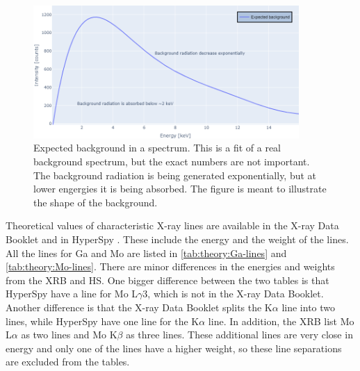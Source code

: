 \begin{figure}[p]
    \centering
    \includegraphics[width=0.9\textwidth]{figures/expected_background.png}
    \caption{
        Expected background in a spectrum.
        This is a fit of a real background spectrum, but the exact numbers are not important.
        The background radiation is being generated exponentially, but at lower engergies it is being absorbed.
        The figure is meant to illustrate the shape of the background.
    }
    \label{fig:theory:expected_background}
\end{figure}





Theoretical values of characteristic X-ray lines are available in the X-ray Data Booklet \cite{thompson_x-ray_2004} and in HyperSpy \cite{hyperspy_1.7.1}.
These include the energy and the weight of the lines.
All the lines for Ga and Mo are listed in \cref{tab:theory:Ga-lines} and \cref{tab:theory:Mo-lines}.
There are minor differences in the energies and weights from the XRB and HS.
One bigger difference between the two tables is that HyperSpy have a line for Mo L$\gamma$3, which is not in the X-ray Data Booklet.
Another difference is that the X-ray Data Booklet splits the K$\alpha$ line into two lines, while HyperSpy have one line for the K$\alpha$ line.
In addition, the XRB list Mo L$\alpha$ as two lines and Mo K$\beta$ as three lines.
These additional lines are very close in energy and only one of the lines have a higher weight, so these line separations are excluded from the tables.


